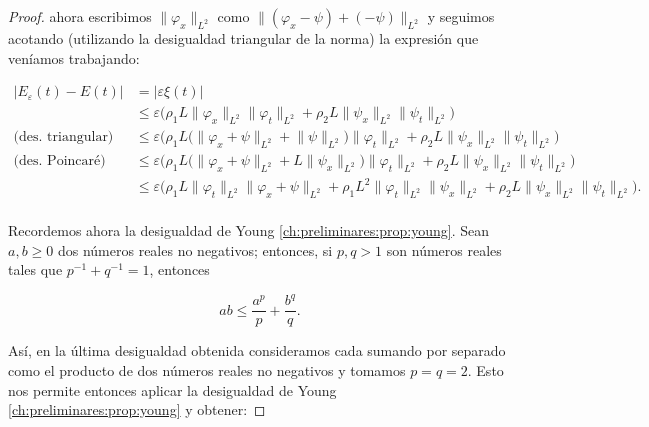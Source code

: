 \begin{proof}
    ahora escribimos $\lVert \varphi_x\rVert_{L^2}$ como $\lVert (\varphi_x - \psi) + (-\psi)\rVert_{L^2}$ y seguimos acotando (utilizando la desigualdad triangular de la norma) la expresión que veníamos trabajando:

    \begin{align*}
        \lvert E_\varepsilon(t) - E(t)\lvert &= \lvert \varepsilon \xi(t) \lvert\\
        &\leq \varepsilon\Bigg( \rho_1L \lVert \varphi_x \rVert_{L^2} \lVert \varphi_t \rVert_{L^2} + \rho_2L\lVert\psi_x\rVert_{L^2} \lVert\psi_t\rVert_{L^2} \Bigg)\\
        \text{(des. triangular)} &\leq \varepsilon\Bigg( \rho_1 L \big(\lVert\varphi_x + \psi\rVert_{L^2} + \lVert\psi\rVert_{L^2}\big)\lVert \varphi_t\rVert_{L^2} + \rho_2L\lVert\psi_x\rVert_{L^2} \lVert\psi_t\rVert_{L^2} \Bigg)\\
        \text{(des. Poincaré)} &\leq \varepsilon\Bigg( \rho_1 L \big(\lVert\varphi_x + \psi\rVert_{L^2} + L\lVert\psi_x\rVert_{L^2}\big)\lVert \varphi_t\rVert_{L^2} + \rho_2L\lVert\psi_x\rVert_{L^2} \lVert\psi_t\rVert_{L^2} \Bigg)\\
        &\leq \varepsilon\Bigg( \rho_1 L \lVert \varphi_t\rVert_{L^2}\lVert\varphi_x + \psi\rVert_{L^2} + \rho_1L^2\lVert \varphi_t\rVert_{L^2}\lVert\psi_x\rVert_{L^2} + \rho_2L\lVert\psi_x\rVert_{L^2} \lVert\psi_t\rVert_{L^2} \Bigg).\\
    \end{align*}

    Recordemos ahora la desigualdad de Young \ref{ch:preliminares:prop:young}. Sean $a,b\geq0$ dos números reales no negativos; entonces, si $p,q>1$ son números reales tales que $p^{-1} + q^{-1}=1$, entonces

    \[ab \leq \frac{a^p}{p} + \frac{b^q}{q}.\]

    Así, en la última desigualdad obtenida consideramos cada sumando por separado como el producto de dos números reales no negativos y tomamos $p=q=2$. Esto nos permite entonces aplicar la desigualdad de Young \ref{ch:preliminares:prop:young} y obtener:


\end{proof}
